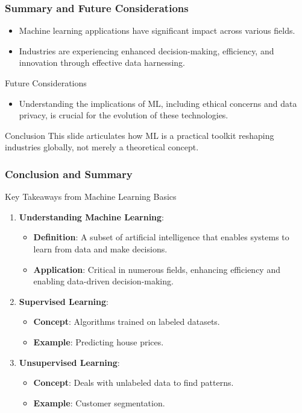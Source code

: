 \documentclass[aspectratio=169]{beamer}
\begin{document}
\begin{frame}[fragile]
    \frametitle{Summary and Future Considerations}
    \begin{itemize}
        \item Machine learning applications have significant impact across various fields.
        \item Industries are experiencing enhanced decision-making, efficiency, and innovation through effective data harnessing.
    \end{itemize}
    
    \begin{block}{Future Considerations}
        \begin{itemize}
            \item Understanding the implications of ML, including ethical concerns and data privacy, is crucial for the evolution of these technologies.
        \end{itemize}
    \end{block}
    \begin{block}{Conclusion}
        This slide articulates how ML is a practical toolkit reshaping industries globally, not merely a theoretical concept.
    \end{block}
\end{frame}

\begin{frame}[fragile]
    \frametitle{Conclusion and Summary}
    \begin{block}{Key Takeaways from Machine Learning Basics}
        \begin{enumerate}
            \item \textbf{Understanding Machine Learning}:
            \begin{itemize}
                \item \textbf{Definition}: A subset of artificial intelligence that enables systems to learn from data and make decisions.
                \item \textbf{Application}: Critical in numerous fields, enhancing efficiency and enabling data-driven decision-making.
            \end{itemize}
            \item \textbf{Supervised Learning}:
            \begin{itemize}
                \item \textbf{Concept}: Algorithms trained on labeled datasets.
                \item \textbf{Example}: Predicting house prices.
            \end{itemize}
            \item \textbf{Unsupervised Learning}:
            \begin{itemize}
                \item \textbf{Concept}: Deals with unlabeled data to find patterns.
                \item \textbf{Example}: Customer segmentation.
            \end{itemize}
        \end{enumerate}
    \end{block}
\end{frame}
\end{document}
